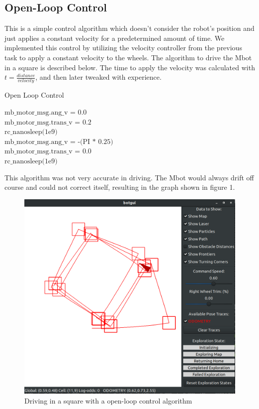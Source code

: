 \documentclass[conference]{IEEEtran}
\begin{document}
\subsection{Open-Loop Control}
This is a simple control algorithm which doesn't consider the robot's position and just applies a constant velocity for a predetermined amount of time. We implemented this control by utilizing the velocity controller from the previous task to apply a constant velocity to the wheels. The algorithm to drive the Mbot in a square is described below. The time to apply the velocity was calculated with $t=\frac{distance}{velocity}$, and then later tweaked with experience.
\begin{algorithm}[H]
\caption{Open Loop Control}
\begin{algorithmic}[0]
        \STATE $\text{mb\_motor\_msg.ang\_v = 0.0}$\\
        \STATE $\text{mb\_motor\_msg.trans\_v = 0.2}$\\
        \STATE $\text{rc\_nanosleep(1e9)}$\\
        \STATE $\text{mb\_motor\_msg.ang\_v = -(PI * 0.25)}$\\
        \STATE $\text{mb\_motor\_msg.trans\_v = 0.0}$\\
        \STATE $\text{rc\_nanosleep(1e9)}$\\
    \ENDFOR
\ENDFOR
\end{algorithmic}
\end{algorithm}
This algorithm was not very accurate in driving. The Mbot would always drift off course and could not correct itself, resulting in the graph shown in figure 1.
\begin{figure}[H]
    \centering
    \includegraphics[width=\linewidth]{task4_corners.png}
    \caption{Driving in a square with a open-loop control algorithm}
    \label{fig:Captured Mbot's odometry when driving in a square with closed-loop controllers}
\end{figure}
\end{document}
